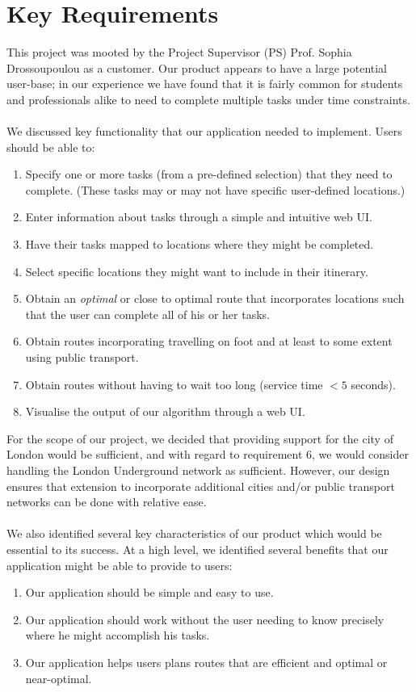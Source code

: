 \documentclass[a4paper, 10pt]{report}
\begin{document}
\section{Key Requirements}
This project was mooted by the Project Supervisor (PS) Prof. Sophia Drossoupoulou as a customer. Our product appears to have a large potential user-base; in our experience we have found that it is fairly common for students and professionals alike to need to complete multiple tasks under time constraints. \\\\
We discussed key functionality that our application needed to implement. Users should be able to:
\begin{enumerate}
\item Specify one or more tasks (from a pre-defined selection) that they need to complete. (These tasks may or may not have specific user-defined locations.)
\item Enter information about tasks through a simple and intuitive web UI.
\item Have their tasks mapped to locations where they might be completed.
\item Select specific locations they might want to include in their itinerary.
\item Obtain an \textit{optimal} or close to optimal route that incorporates locations such that the user can complete all of his or her tasks. 
\item Obtain routes incorporating travelling on foot and at least to some extent using public transport.
\item Obtain routes without having to wait too long (service time $< 5$ seconds).
\item Visualise the output of our algorithm through a web UI.
\end{enumerate}
For the scope of our project, we decided that providing support for the city of London would be sufficient, and with regard to requirement 6, we would consider handling the London Underground network as sufficient. However, our design ensures that extension to incorporate additional cities and/or public transport networks can be done with relative ease. \\\\
We also identified several key characteristics of our product which would be essential to its success. At a high level, we identified several benefits that our application might be able to provide to users:
\begin{enumerate}
\item Our application should be simple and easy to use.
\item Our application should work without the user needing to know precisely where he might accomplish his tasks.
\item Our application helps users plans routes that are efficient and optimal or near-optimal.
\end{enumerate}
\end{document}
